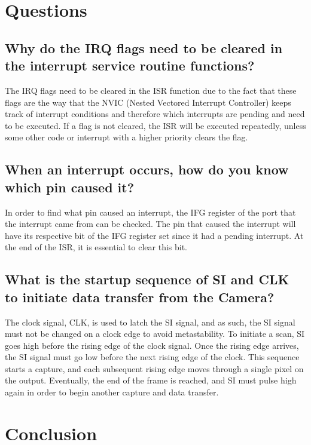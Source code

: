 \documentclass[conference]{IEEEtran}
\begin{document}
\section{Questions}

\subsection{Why do the IRQ flags need to be cleared in the interrupt service
routine functions?}

The IRQ flags need to be cleared in the ISR function due to the fact that
these flags are the way that the NVIC (Nested Vectored Interrupt Controller)
keeps track of interrupt conditions and therefore which interrupts are pending 
and need to be executed. If a flag is not cleared, the ISR will be executed 
repeatedly, unless some other code or interrupt with a higher priority clears 
the flag.

\subsection{When an interrupt occurs, how do you know which pin caused it?}

In order to find what pin caused an interrupt, the IFG register of the port
that the interrupt came from can be checked. The pin that caused the
interrupt will have its respective bit of the IFG register set since it had
a pending interrupt. At the end of the ISR, it is essential to clear this
bit.

\subsection{What is the startup sequence of SI and CLK to initiate data 
transfer from the Camera?}

The clock signal, CLK, is used to latch the SI signal, and as such, the SI
signal must not be changed on a clock edge to avoid metastability. To
initiate a scan, SI goes high before the rising edge of the clock signal.
Once the rising edge arrives, the SI signal must go low before the next
rising edge of the clock. This sequence starts a capture, and each subsequent
rising edge moves through a single pixel on the output. Eventually, the end
of the frame is reached, and SI must pulse high again in order to begin
another capture and data transfer.

\section{Conclusion}
\end{document}
